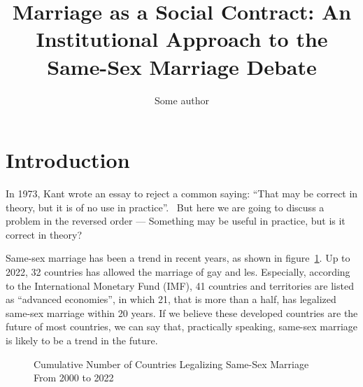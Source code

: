\documentclass{article}
\title{Marriage as a Social Contract: An Institutional Approach to the Same-Sex Marriage Debate}
\author{Some author}
\begin{document}
\maketitle
\newpage
\tableofcontents
\newpage
\section{Introduction}
In 1973, Kant wrote an essay to reject a common saying: ``That may be correct in theory, but it is of no use in practice''.~\autocite{kantCommonSayingThat2009} But here we are going to discuss a problem in the reversed order --- Something may be useful in practice, but is it correct in theory? 

Same-sex marriage has been a trend in recent years, as shown in figure~\ref{Cumu}. Up to 2022, 32 countries has allowed the marriage of gay and les. Especially, according to the International Monetary Fund (IMF), 41 countries and territories are listed as ``advanced economies'', in which 21, that is more than a half, has legalized same-sex marriage within 20 years. If we believe these developed countries are the future of most countries, we can say that, practically speaking, same-sex marriage is likely to be a trend in the future.


\begin{figure}[H]
    \centering
        
    \caption{Cumulative Number of Countries Legalizing Same-Sex Marriage From 2000 to 2022~\autocite{perper32CountriesWorld2022}}
    \label{Cumu}
\end{figure}
    
\end{document}
